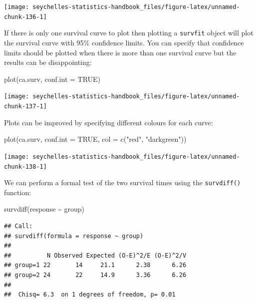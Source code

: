 \documentclass[
  12pt,
]{book}
\newenvironment{Shaded}{\begin{snugshade}}{\end{snugshade}}
\newcommand{\AttributeTok}[1]{\textcolor[rgb]{0.77,0.63,0.00}{#1}}
\newcommand{\ConstantTok}[1]{\textcolor[rgb]{0.00,0.00,0.00}{#1}}
\newcommand{\FunctionTok}[1]{\textcolor[rgb]{0.00,0.00,0.00}{#1}}
\newcommand{\NormalTok}[1]{#1}
\newcommand{\SpecialCharTok}[1]{\textcolor[rgb]{0.00,0.00,0.00}{#1}}
\newcommand{\StringTok}[1]{\textcolor[rgb]{0.31,0.60,0.02}{#1}}
\begin{document}
\begin{center}\texttt{[image: seychelles-statistics-handbook\_files/figure-latex/unnamed-chunk-136-1]} \end{center}

If there is only one survival curve to plot then plotting a \texttt{survfit} object will plot the survival curve with 95\% confidence limits. You can specify that confidence limits should be plotted when there is more than one survival curve but the results can be disappointing:

\begin{Shaded}
\begin{Highlighting}[]
\FunctionTok{plot}\NormalTok{(ca.surv, }\AttributeTok{conf.int =} \ConstantTok{TRUE}\NormalTok{)}
\end{Highlighting}
\end{Shaded}

\begin{center}\texttt{[image: seychelles-statistics-handbook\_files/figure-latex/unnamed-chunk-137-1]} \end{center}

Plots can be improved by specifying different colours for each curve:

\begin{Shaded}
\begin{Highlighting}[]
\FunctionTok{plot}\NormalTok{(ca.surv, }\AttributeTok{conf.int =} \ConstantTok{TRUE}\NormalTok{, }\AttributeTok{col =} \FunctionTok{c}\NormalTok{(}\StringTok{"red"}\NormalTok{, }\StringTok{"darkgreen"}\NormalTok{))}
\end{Highlighting}
\end{Shaded}

\begin{center}\texttt{[image: seychelles-statistics-handbook\_files/figure-latex/unnamed-chunk-138-1]} \end{center}

We can perform a formal test of the two survival times using the \texttt{survdiff()} function:

\begin{Shaded}
\begin{Highlighting}[]
\FunctionTok{survdiff}\NormalTok{(response }\SpecialCharTok{\textasciitilde{}}\NormalTok{ group)}
\end{Highlighting}
\end{Shaded}

\begin{verbatim}
## Call:
## survdiff(formula = response ~ group)
## 
##          N Observed Expected (O-E)^2/E (O-E)^2/V
## group=1 22       14     21.1      2.38      6.26
## group=2 24       22     14.9      3.36      6.26
## 
##  Chisq= 6.3  on 1 degrees of freedom, p= 0.01
\end{verbatim}
\end{document}

